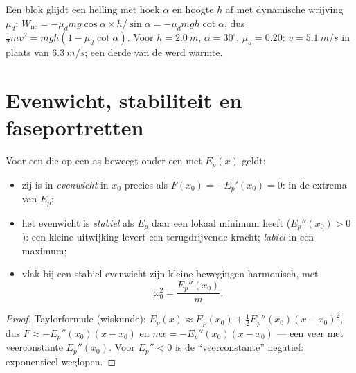 \begin{example}\label{ex:b1:work-and-energy:friction}
Een blok glijdt een helling met hoek $\alpha$ en hoogte $h$ af met
dynamische wrijving $\mu_d$: $W_{\text{nc}} = -\mu_dmg\cos\alpha \times
h/\sin\alpha = -\mu_dmgh\cot\alpha$, dus $\tfrac12 mv^2 = mgh(1 - \mu_d\cot\alpha)$.
Voor $h = \qty{2.0}{m}$, $\alpha = 30^\circ$, $\mu_d = 0.20$: $v =
\qty{5.1}{m/s}$ in plaats van $\qty{6.3}{m/s}$; een derde van de  werd warmte.
\end{example}

\section{Evenwicht, stabiliteit en faseportretten}

\begin{proposition}\label{prop:b1:work-and-energy:stability}
Voor een  die op een as beweegt onder een  met  $E_p(x)$ geldt:
\begin{itemize}
  \item zij is in \emph{evenwicht} in $x_0$ precies als $F(x_0) = -E_p'(x_0) = 0$:
        in de extrema van $E_p$;
  \item het evenwicht is \emph{stabiel} als $E_p$ daar een lokaal minimum
        heeft ($E_p''(x_0) > 0$): een kleine uitwijking levert een
        terugdrijvende kracht; \emph{labiel} in een maximum;
  \item vlak bij een stabiel evenwicht zijn kleine bewegingen harmonisch, met
        \[
        \omega_0^2 = \frac{E_p''(x_0)}{m} .
        \]
\end{itemize}
\end{proposition}

\begin{proof}
Taylorformule (wiskunde): $E_p(x) \approx E_p(x_0) +
\tfrac12 E_p''(x_0)(x - x_0)^2$, dus $F \approx -E_p''(x_0)(x - x_0)$ en
$m\ddot x = -E_p''(x_0)(x - x_0)$ --- een veer met veerconstante $E_p''(x_0)$.
Voor $E_p'' < 0$ is de ``veerconstante'' negatief: exponentieel weglopen.
\end{proof}

